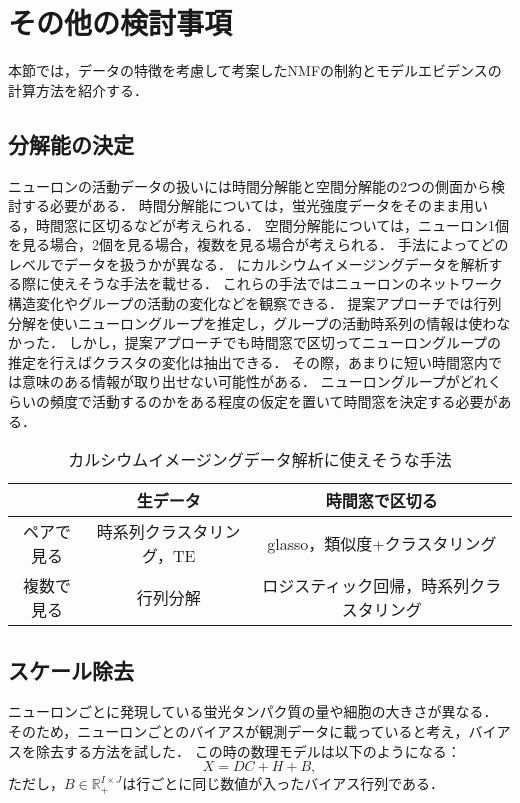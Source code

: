 \chapter{その他の検討事項}
本節では，データの特徴を考慮して考案したNMFの制約とモデルエビデンスの計算方法を紹介する．

\section{分解能の決定}
ニューロンの活動データの扱いには時間分解能と空間分解能の2つの側面から検討する必要がある．
時間分解能については，蛍光強度データをそのまま用いる，時間窓に区切るなどが考えられる．
空間分解能については，ニューロン1個を見る場合，2個を見る場合，複数を見る場合が考えられる．
手法によってどのレベルでデータを扱うかが異なる．
にカルシウムイメージングデータを解析する際に使えそうな手法を載せる．
これらの手法ではニューロンのネットワーク構造変化やグループの活動の変化などを観察できる．
提案アプローチでは行列分解を使いニューロングループを推定し，グループの活動時系列の情報は使わなかった．
しかし，提案アプローチでも時間窓で区切ってニューロングループの推定を行えばクラスタの変化は抽出できる．
その際，あまりに短い時間窓内では意味のある情報が取り出せない可能性がある．
ニューロングループがどれくらいの頻度で活動するのかをある程度の仮定を置いて時間窓を決定する必要がある．

\begin{table}[htb]
  \center
  \begin{tabular}{|c|cc|} \hline
    & 生データ & 時間窓で区切る \\ \hline
    ペアで見る & 時系列クラスタリング，TE & glasso，類似度+クラスタリング\\
	  複数で見る & 行列分解 & ロジスティック回帰，時系列クラスタリング \\ \hline
  \end{tabular}
  \caption{カルシウムイメージングデータ解析に使えそうな手法}
  \label{tab:methods}
\end{table}

\section{スケール除去}
ニューロンごとに発現している蛍光タンパク質の量や細胞の大きさが異なる．
そのため，ニューロンごとのバイアスが観測データに載っていると考え，バイアスを除去する方法を試した．
この時の数理モデルは以下のようになる：
\begin{equation}
	X = DC + H + B,
\end{equation}
ただし，$B \in \mathbb{R}_+^{I\times J}$は行ごとに同じ数値が入ったバイアス行列である．


